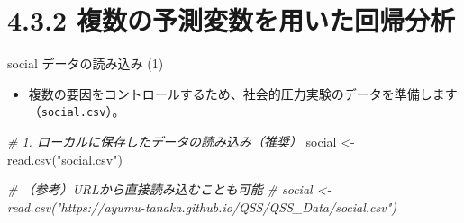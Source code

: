 \documentclass[
  ignorenonframetext,
]{beamer}
\newenvironment{Shaded}{\begin{snugshade}}{\end{snugshade}}
\newcommand{\CommentTok}[1]{\textcolor[rgb]{0.56,0.35,0.01}{\textit{#1}}}
\newcommand{\FunctionTok}[1]{\textcolor[rgb]{0.00,0.00,0.00}{#1}}
\newcommand{\NormalTok}[1]{#1}
\newcommand{\OtherTok}[1]{\textcolor[rgb]{0.56,0.35,0.01}{#1}}
\newcommand{\StringTok}[1]{\textcolor[rgb]{0.31,0.60,0.02}{#1}}
\providecommand{\tightlist}{%
  \setlength{\itemsep}{0pt}\setlength{\parskip}{0pt}}
\begin{document}
\hypertarget{ux8907ux6570ux306eux4e88ux6e2cux5909ux6570ux3092ux7528ux3044ux305fux56deux5e30ux5206ux6790}{%
\section{4.3.2
複数の予測変数を用いた回帰分析}\label{ux8907ux6570ux306eux4e88ux6e2cux5909ux6570ux3092ux7528ux3044ux305fux56deux5e30ux5206ux6790}}

\begin{frame}[fragile]{social データの読み込み (1)}
\protect\hypertarget{social-ux30c7ux30fcux30bfux306eux8aadux307fux8fbcux307f-1}{}
\begin{itemize}
\tightlist
\item
  複数の要因をコントロールするため、社会的圧力実験のデータを準備します（\texttt{social.csv}）。
\end{itemize}

\scriptsize

\begin{Shaded}
\begin{Highlighting}[]
\CommentTok{\# 1. ローカルに保存したデータの読み込み（推奨）}
\NormalTok{social }\OtherTok{\textless{}{-}} \FunctionTok{read.csv}\NormalTok{(}\StringTok{"social.csv"}\NormalTok{)}

\CommentTok{\# （参考）URLから直接読み込むことも可能}
\CommentTok{\# social \textless{}{-} read.csv("https://ayumu{-}tanaka.github.io/QSS/QSS\_Data/social.csv")}
\end{Highlighting}
\end{Shaded}

\normalsize
\end{frame}
\end{document}
